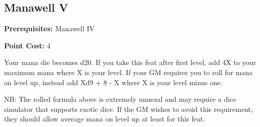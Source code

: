 \subsection{Manawell V}\label{feat:manawell5}

\noindent
\textbf{Prerequisites:} Manawell IV

\noindent
\textbf{Point Cost:} 4 

Your mana die becomes d20. If you take this feat after first level, add 4X to
your maximum mana where X is your level. If your GM requires you to roll for
mana on level up, instead add Xd9 + 8 - X where X is your level minus one.

NB: The rolled formula above is extremely unusual and may require a dice
simulator that supports exotic dice. If the GM wishes to avoid this
requirement, they should allow average mana on level up at least for this
feat.

